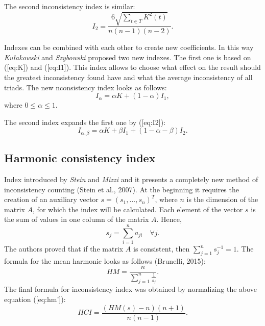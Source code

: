The second inconsistency index is similar:
	\begin{equation} 
		I_{2}=\frac{6\sqrt{\sum_{t\in T}K^{2}(t)}}{n(n-1)(n-2)}.
	 \end{equation}

Indexes can be combined with each other to create new coefficients. In this way \textit{Kułakowski} and \textit{Szybowski} proposed two new indexes. The first one is based on ([eq:K]) and ([eq:I1]). This index allows to choose what effect on the result should the greatest inconsistency found have and what the average inconsistency of all triads. The new nconsistency index looks as follows:
	\begin{equation} 
		I_{\alpha}=\alpha K+(1-\alpha)I_{1},
	 \end{equation}
 where $0\leq\alpha\leq1$.
  
The second index expands the first one by ([eq:I2]):
	\begin{equation} 
		I_{\alpha,\beta}=\alpha K+\beta I_{1}+(1-\alpha-\beta)I_{2}.
	 \end{equation}
 

\subsection{Harmonic consistency index}

Index introduced by \textit{Stein} and \textit{Mizzi} and it presents a completely new method of inconsistency counting (Stein et al., 2007). At the beginning it requires the creation of an auxiliary vector $s=(s_{1},...,s_{n})^{T}$, where $n$ is the dimension of the matrix $A$, for which the index will be calculated. Each element of the vector $s$ is the sum of values in one column of the matrix $A$. Hence, 
	\begin{equation} 
		s_{j}=\sum_{i=1}^{n}a_{ji}\,\,\,\,\,\,\forall j.
	 \end{equation}
 The authors proved that if the matrix $A$ is consistent, then $\sum_{j=1}^{n}s_{j}^{-1}=1$. The formula for the mean harmonic looks as follows (Brunelli, 2015):
 	\begin{equation} 
		HM=\frac{n}{\sum_{j=1}^{n}\frac{1}{s_{j}}}.
	 \end{equation}
 The final formula for inconsistency index was obtained by normalizing the above equation ([eq:hm']):
 	\begin{equation} 
		HCI=\frac{\left(HM(s)-n\right)\left(n+1\right)}{n(n-1)}.
	 \end{equation}
 

